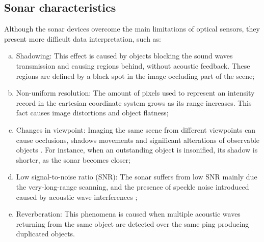 \documentclass[final,5p,times]{elsarticle}
\begin{document}

\subsection{Sonar characteristics}
\label{sonar:characteristics}

Although the sonar devices overcome the main limitations of optical sensors, they present more difficult data interpretation, such as:

\begin{enumerate}[(a)]
    \item Shadowing: This effect is caused by objects blocking the sound waves transmission and causing regions behind, without acoustic feedback. These regions are defined by a black spot in the image occluding part of the scene;
    \item Non-uniform resolution: The amount of pixels used to represent an intensity record in the cartesian coordinate system grows as its range increases. This fact causes image distortions and object flatness;
    \item Changes in viewpoint: Imaging the same scene from different viewpoints can cause occlusions, shadows movements and significant alterations of observable objects \cite{hurtos2014}. For instance, when an outstanding object is insonified, its shadow is shorter, as the sonar becomes closer;
    \item Low signal-to-noise ratio (SNR): The sonar suffers from low SNR mainly due the very-long-range scanning, and the presence of speckle noise introduced caused by acoustic wave interferences \cite{abbott1979};
    \item Reverberation: This phenomena is caused when multiple acoustic waves returning from the same object are detected over the same ping producing duplicated objects.
\end{enumerate}
\end{document}
